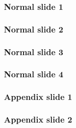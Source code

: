 \documentclass{beamer}
\begin{document}
\frame{\titlepage}

\begin{frame}
\frametitle{Normal slide 1}
\end{frame}

\begin{frame}
\frametitle{Normal slide 2}
\end{frame}

\begin{frame}
\frametitle{Normal slide 3}
\end{frame}

\begin{frame}
\frametitle{Normal slide 4}
\end{frame}

\appendix

\begin{frame}
\frametitle{Appendix slide 1}
\end{frame}

\begin{frame}
\frametitle{Appendix slide 2}
\end{frame}
\end{document}
